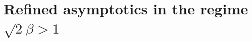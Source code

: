 \documentclass[a4paper, 11pt, twoside, leqno]{article}
\theoremstyle{definition}              %
\theoremstyle{remark}                  %
\newcommand{\abs}[1]{\left| #1 \right|}                             %
\renewcommand{\u}{\mathbf{u}}
\newcommand{\eps}{\varepsilon}
\newcommand{\BBB}{\color{blue}}
\begin{document}

\section{Refined asymptotics in the regime $\sqrt{2}\beta > 1$}\label{sec:decay-u2}
\end{document}
